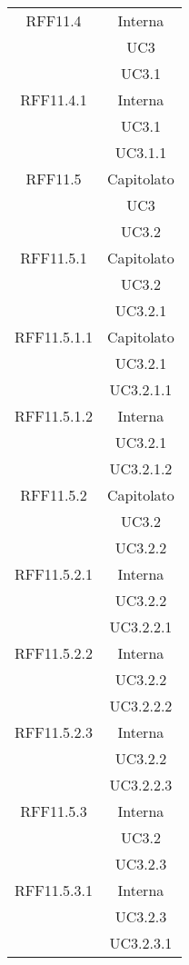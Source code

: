 \begin{longtable}{|c|c|}
\midrule
RFF11.4
& Interna\\
& UC3\\
& UC3.1\\

\midrule
RFF11.4.1
& Interna\\
& UC3.1\\
& UC3.1.1\\

\midrule
RFF11.5
& Capitolato\\
& UC3\\
& UC3.2\\

\midrule
RFF11.5.1
& Capitolato\\
& UC3.2\\
& UC3.2.1\\

\midrule
RFF11.5.1.1
& Capitolato\\
& UC3.2.1\\
& UC3.2.1.1\\

\midrule
RFF11.5.1.2
& Interna\\
& UC3.2.1\\
& UC3.2.1.2\\

\midrule
RFF11.5.2
& Capitolato\\
& UC3.2\\
& UC3.2.2\\

\midrule
RFF11.5.2.1
& Interna\\
& UC3.2.2\\
& UC3.2.2.1\\

\midrule
RFF11.5.2.2
& Interna\\
& UC3.2.2\\
& UC3.2.2.2\\

\midrule
RFF11.5.2.3
& Interna\\
& UC3.2.2\\
& UC3.2.2.3\\

\midrule
RFF11.5.3
& Interna\\
& UC3.2\\
& UC3.2.3\\

\midrule
RFF11.5.3.1
& Interna\\
& UC3.2.3\\
& UC3.2.3.1\\


\end{longtable}
